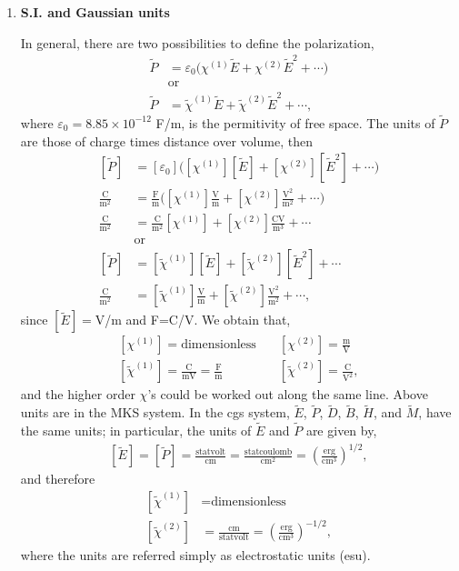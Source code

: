 \documentclass[12pt]{article}
\numberwithin{equation}{section}
\begin{document}
\begin{enumerate}

\item {\bf S.I. and Gaussian units}


In general, there are two possibilities to define the
  polarization,
\begin{align}\label{u.69}
\tilde P&=\varepsilon_0\Big(\chi^{(1)}\tilde E+\chi^{(2)}\tilde E^2+\cdots\Big) 
\\
&\text{or}
\nonumber\\\label{u.69n}
\tilde P&=\tilde\chi^{(1)}\tilde E+\tilde\chi^{(2)}\tilde E^2+\cdots  
,
\end{align}  
where $\varepsilon_0=8.85 \times 10^{−12}$ F/m, is the permitivity of free space.
The units of $\tilde P$ 
are those of charge times distance over
volume, then 
\begin{align}\label{u.691}
[\tilde P]&=[\varepsilon_0]\Big([\chi^{(1)}][\tilde E]+[\chi^{(2)}][\tilde E^2]+\cdots\Big) 
\nonumber\\
\frac{\text{C}}{\text{m}^2}&=
\frac{\text{F}}{\text{m}}
\Big([\chi^{(1)}]\frac{\text{V}}{\text{m}}
+[\chi^{(2)}]\frac{\text{V}^2}{\text{m}^2}
+\cdots\Big) 
\nonumber\\
\frac{\text{C}}{\text{m}^2}&=
\frac{\text{C}}{\text{m}^2}
[\chi^{(1)}]
+[\chi^{(2)}]\frac{\text{CV}}{\text{m}^3}
+\cdots 
\nonumber\\
&\text{or}
\nonumber\\
[\tilde P]&=[\tilde\chi^{(1)}][\tilde E]+[\tilde\chi^{(2)}][\tilde E^2]+\cdots 
\nonumber\\
\frac{\text{C}}{\text{m}^2}&=
[\tilde\chi^{(1)}]\frac{\text{V}}{\text{m}}
+[\tilde\chi^{(2)}]\frac{\text{V}^2}{\text{m}^2}
+\cdots 
,
\end{align}  
since $[\tilde E]=$V/m and F=C/V. We obtain that,
\begin{align}\label{u.692}
[\chi^{(1)}]=\text{dimensionless}
&\quad 
[\chi^{(2)}]=\frac{\text{m}}{\text{V}}
\nonumber\\
[\tilde\chi^{(1)}]=\frac{\text{C}}{\text{mV}}=\frac{\text{F}}{\text{m}}
&\quad 
[\tilde\chi^{(2)}]=\frac{\text{C}}{\text{V}^2}
,
\end{align}
and the higher order $\chi$'s could be worked out along the same
line. Above units are in the MKS system. In the cgs system, 
$\tilde E$, $\tilde P$, $\tilde D$, $\tilde B$, $\tilde H$, and
$\tilde M$, have the same units; in particular, the units of $\tilde
E$ and $\tilde P$ are given by,
\begin{align}\label{u.2}
[\tilde E]=[\tilde P]=
\frac{\text{statvolt}}{\text{cm}}
=
\frac{\text{statcoulomb}}{\text{cm}^2}
=
\left(\frac{\text{erg}}{\text{cm}^3}\right)^{1/2}
,
\end{align} 
and therefore 
\begin{align}\label{u.3}
[\tilde \chi^{(1)}]&=\text{dimensionless}
\nonumber\\
[\tilde \chi^{(2)}]&=
\frac{\text{cm}}{\text{statvolt}}
=\left(\frac{\text{erg}}{\text{cm}^3}\right)^{-1/2}
,
\end{align}
where the units are referred simply as electrostatic units (esu). 


\end{enumerate}
\end{document}
